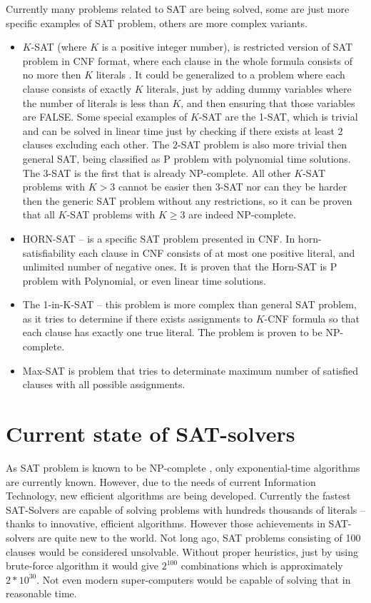 \documentclass[12pt,english,pdflatex]{aghdpl}
\begin{document}
Currently many problems related to SAT are being solved, some are
just more specific examples of SAT problem, others are more complex
variants.
\begin{itemize}
\item $K$-SAT (where $K$ is a positive integer number), is restricted version of
SAT problem in CNF format, where each clause in the whole formula consists of
no more then $K$ literals \cite{jukna:2013}. It could be generalized to a problem where
each clause consists of exactly $K$ literals, just by adding dummy variables
where the number of literals is less than $K$, and then ensuring that those
variables are FALSE. Some special examples of $K$-SAT are the 1-SAT, which
is trivial and can be solved in linear time just by checking if there
exists at least 2 clauses excluding each other. The 2-SAT problem is also
more trivial then general SAT, being classified as P problem with
polynomial time solutions. The 3-SAT is the first that is already NP-complete.
All other $K$-SAT problems with $K>3$ cannot be easier then 3-SAT nor
can they be harder then the generic SAT problem without any restrictions,
so it can be proven that all $K$-SAT problems with $K\geq3$ are indeed NP-complete.
\item HORN-SAT -- is a specific SAT problem presented in CNF. In horn-satisfiability
each clause in CNF consists of at most one positive literal, and unlimited
number of negative ones. It is proven that the Horn-SAT is P problem with Polynomial,
or even linear time solutions.
\item The 1-in-K-SAT -- this problem is more complex than general SAT problem, as
it tries to determine if there exists assignments to $K$-CNF formula
so that each clause has exactly one true literal. The problem is proven
to be NP-complete.
\item Max-SAT is problem that tries to determinate maximum number of satisfied
clauses with all possible assignments.
\end{itemize}





\section{Current state of SAT-solvers}
\label{sec:stateofSat}

As SAT problem is known to be NP-complete \cite{Cook:1971}, only exponential-time algorithms
are currently known. However, due to the needs of current Information
Technology, new efficient algorithms are being developed. Currently the fastest
SAT-Solvers are capable of solving problems with hundreds thousands
of literals -- thanks to innovative, efficient algorithms. However those achievements
in SAT-solvers are quite new to the world. Not long ago, SAT problems
consisting of 100 clauses would be considered unsolvable. Without proper heuristics,
just by using brute-force algorithm it would give $2^{100}$ combinations
which is approximately $2*10^{30}$. Not even modern
super-computers would be capable of solving that in reasonable
time.
\end{document}
